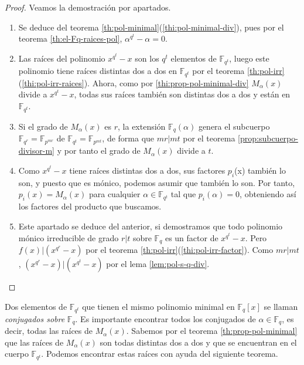 \begin{proof}
  Veamos la demostración por apartados.
  \begin{enumerate}
    \item Se deduce del teorema \ref{th:pol-minimal}(\ref{thi:pol-minimal-div}), pues por el teorema \ref{th:el-Fq-raices-pol}, \(\alpha^{q^t} - \alpha = 0\).
    \item Las raíces del polinomio \(x^{q^t} - x\) son los \(q^t\) elementos de \(\mathbb F_{q^t}\), luego este polinomio tiene raíces distintas dos a dos en \(\mathbb F_{q^t}\) por el teorema \ref{th:pol-irr}(\ref{thi:pol-irr-raices}).
    Ahora, como por \ref{thi:prop-pol-minimal-div} \(M_{\alpha}(x)\) divide a \(x^{q^t} - x\), todas sus raíces también son distintas dos a dos y están en \(\mathbb F_{q^t}\).
    \item Si el grado de \(M_{\alpha}(x)\) es \(r\), la extensión \(\mathbb F_{q}(\alpha)\) genera el subcuerpo \(\mathbb F_{q^r} = \mathbb F_{p^{mr}}\) de \(\mathbb F_{q^t} = \mathbb F_{p^{mt}}\), de forma que \(mr | mt\) por el teorema \ref{prop:subcuerpo-divisor-m} y por tanto el grado de \(M_{\alpha}(x)\) divide a \(t\).
    \item Como \(x^{q^t} - x\) tiene raíces distintas dos a dos, sus factores \(p_i\)(x) también lo son, y puesto que es mónico, podemos asumir que también lo son.
    Por tanto, \(p_{i}(x) = M_{\alpha}(x)\) para cualquier \(\alpha \in \mathbb F_{q^t}\) tal que \(p_i(\alpha) = 0\), obteniendo así los factores del producto que buscamos.
    \item Este apartado se deduce del anterior, si demostramos que todo polinomio mónico irreducible de grado \(r | t\) sobre \(\mathbb F_q\) es un factor de \(x^{q^t} - x\).
    Pero \(f(x) | (x^{q^r} - x)\) por el teorema \ref{th:pol-irr}(\ref{thi:pol-irr-factor}).
    Como \(mr | mt\), \((x^{q^r} - x) | (x^{q^t} - x)\) por el lema \ref{lem:pol-s-q-div}.\qedhere
  \end{enumerate}
\end{proof}

Dos elementos de \(\mathbb F_{q^t}\) que tienen el mismo polinomio minimal en \(\mathbb F_q[x]\) se llaman \textit{conjugados sobre} \(\mathbb F_q\).
Es importante encontrar todos los conjugados de \(\alpha \in \mathbb F_q\), es decir, todas las raíces de \(M_{\alpha}(x)\).
Sabemos por el teorema \ref{th:prop-pol-minimal} que las raíces de \(M_{\alpha}(x)\) son todas distintas dos a dos y que se encuentran en el cuerpo \(\mathbb F_{q^t}\).
Podemos encontrar estas raíces con ayuda del siguiente teorema.

